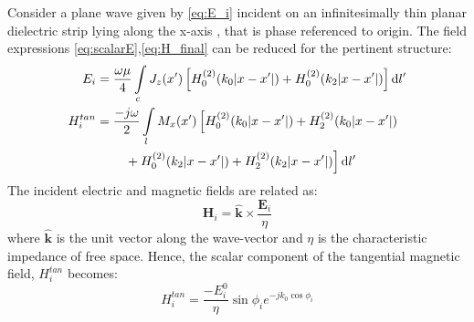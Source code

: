 \documentclass[11pt]{article}
\renewcommand{\v}[1]{\mathbf{#1}} %
\renewcommand{\O}{\omega}  %
\renewcommand{\u}{\mu}  %
\newcommand{\x}{\times}  %
\renewcommand{\^}{\hat}  %
\newcommand*\diff{\mathop{}\!\mathrm{d}} %
\begin{document}
Consider a plane wave given by \eqref{eq:E_i} incident on an infinitesimally thin planar dielectric strip lying along the x-axis , that is phase referenced to origin. The field expressions \eqref{eq:scalarE},\eqref{eq:H_final} can be reduced for the pertinent structure:
%
\begin{subequations}
  \begin{align}
    E_i &= \frac{\O \u}{4} \int\limits_c J_z(x') \left[ H_0^{(2)}(k_0 |x - x'|) + H_0^{(2)}(k_2 |x - x'|)\right] \diff{l'}
    \label{eq:E_plate}\\
    H_i^{tan} &=  \frac{-j \O}{2} \int\limits_{l} M_x(x') \left[ H_0^{(2)}(k_0 |x - x'|) + H_2^{(2)}(k_0 |x - x'|) \right. \notag\\
    &\qquad \left. {} + H_0^{(2)}(k_2 |x - x'|) + H_2^{(2)}(k_2 |x - x'|)\right]\diff{l'}
    \label{eq:H_plate}
  \end{align}
  \label{eq:plate}
\end{subequations}
%
The incident electric and magnetic fields are related as:
%
\begin{equation}
  \v H_i = \hat{\v k} \x \frac{\v E_i}{\eta}
  \label{eq:H_i}
\end{equation}
%
where $\hat{\v k}$ is the unit vector along the wave-vector and $\eta$ is the characteristic impedance of free space. Hence, the scalar component of the tangential magnetic field, $H_i^{tan}$ becomes:
%
\begin{equation}
  H_i^{tan} = \frac{-E_i^0}{\eta} \sin \phi_i e^{-j k_0 \cos \phi_i}
  \label{eq:H_itan}
\end{equation}
%
\end{document}
